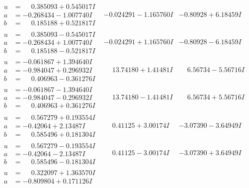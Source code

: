 \documentclass[1p]{elsarticle_modified}
\theoremstyle{definition}
\begin{document}
$$\begin{array}{c|c|c}
 \hline 
\begin{aligned}
u &= \phantom{-}0.385093 + 0.545017 I \\
a &= -0.268434 - 1.007740 I \\
b &= \phantom{-}0.185188 + 0.521817 I\end{aligned}
 & -0.024291 - 1.165760 I & -0.80928 + 6.18459 I \\ \hline\begin{aligned}
u &= \phantom{-}0.385093 - 0.545017 I \\
a &= -0.268434 + 1.007740 I \\
b &= \phantom{-}0.185188 - 0.521817 I\end{aligned}
 & -0.024291 + 1.165760 I & -0.80928 - 6.18459 I \\ \hline\begin{aligned}
u &= -0.061867 + 1.394640 I \\
a &= -0.984047 + 0.296932 I \\
b &= \phantom{-}0.406963 - 0.361276 I\end{aligned}
 & \phantom{-}13.74180 + 1.41481 I & \phantom{-}6.56734 - 5.56716 I \\ \hline\begin{aligned}
u &= -0.061867 - 1.394640 I \\
a &= -0.984047 - 0.296932 I \\
b &= \phantom{-}0.406963 + 0.361276 I\end{aligned}
 & \phantom{-}13.74180 - 1.41481 I & \phantom{-}6.56734 + 5.56716 I \\ \hline\begin{aligned}
u &= \phantom{-}0.567279 + 0.193554 I \\
a &= -0.42064 + 2.13487 I \\
b &= \phantom{-}0.585496 + 0.181304 I\end{aligned}
 & \phantom{-}0.41125 + 3.00174 I & -3.07390 - 3.64949 I \\ \hline\begin{aligned}
u &= \phantom{-}0.567279 - 0.193554 I \\
a &= -0.42064 - 2.13487 I \\
b &= \phantom{-}0.585496 - 0.181304 I\end{aligned}
 & \phantom{-}0.41125 - 3.00174 I & -3.07390 + 3.64949 I \\ \hline\begin{aligned}
u &= \phantom{-}0.322097 + 1.363570 I \\
a &= -0.809804 + 0.171126 I \\

\end{aligned}
\end{array}$$
\end{document}

